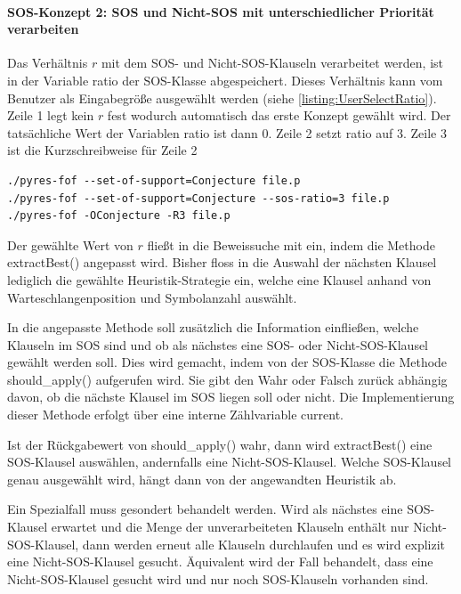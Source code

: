 \paragraph{SOS-Konzept 2: SOS und Nicht-SOS mit unterschiedlicher Priorität verarbeiten}

Das Verhältnis $r$ mit dem SOS- und Nicht-SOS-Klauseln verarbeitet werden, ist in der Variable ratio der SOS-Klasse abgespeichert. Dieses Verhältnis kann vom Benutzer als Eingabegröße ausgewählt werden (siehe \ref{listing:UserSelectRatio}). Zeile 1 legt kein $r$ fest wodurch automatisch das erste Konzept gewählt wird. Der tatsächliche Wert der Variablen ratio ist dann 0. Zeile 2 setzt ratio auf 3. Zeile 3 ist die Kurzschreibweise für Zeile 2

\begin{lstlisting}[label={listing:UserSelectRatio}]
./pyres-fof --set-of-support=Conjecture file.p
./pyres-fof --set-of-support=Conjecture --sos-ratio=3 file.p
./pyres-fof -OConjecture -R3 file.p
\end{lstlisting}

Der gewählte Wert von $r$ fließt in die Beweissuche mit ein, indem die Methode extractBest() angepasst wird. Bisher floss in die Auswahl der nächsten Klausel lediglich die gewählte Heuristik-Strategie ein, welche eine Klausel anhand von Warteschlangenposition und Symbolanzahl auswählt. 

In die angepasste Methode soll zusätzlich die Information einfließen, welche Klauseln im SOS sind und ob als nächstes eine SOS- oder Nicht-SOS-Klausel gewählt werden soll. Dies wird gemacht, indem von der SOS-Klasse die Methode should\_apply() aufgerufen wird. Sie gibt den Wahr oder Falsch zurück abhängig davon, ob die nächste Klausel im SOS liegen soll oder nicht. Die Implementierung dieser Methode erfolgt über eine interne Zählvariable current.

Ist der Rückgabewert von should\_apply() wahr, dann wird extractBest() eine SOS-Klausel auswählen, andernfalls eine Nicht-SOS-Klausel. Welche SOS-Klausel genau ausgewählt wird, hängt dann von der angewandten Heuristik ab.

Ein Spezialfall muss gesondert behandelt werden. Wird als nächstes eine SOS-Klausel erwartet und die Menge der unverarbeiteten Klauseln enthält nur Nicht-SOS-Klausel, dann werden erneut alle Klauseln durchlaufen und es wird explizit eine Nicht-SOS-Klausel gesucht. Äquivalent wird der Fall behandelt, dass eine Nicht-SOS-Klausel gesucht wird und nur noch SOS-Klauseln vorhanden sind.

